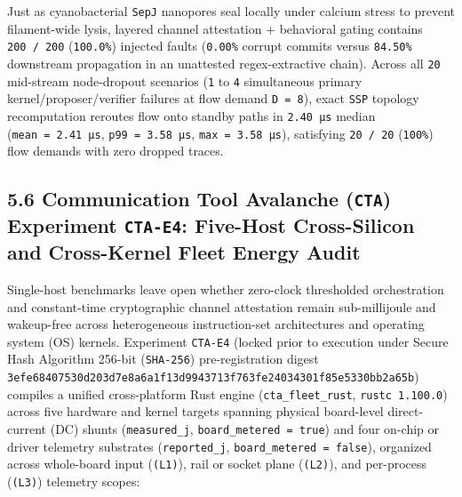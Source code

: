 \documentclass[10pt,letterpaper]{article}
\begin{document}
Just as cyanobacterial \texttt{SepJ} nanopores seal locally under
calcium stress to prevent filament-wide lysis, layered channel
attestation + behavioral gating contains \texttt{200\ /\allowbreak{}\ 200}
(\texttt{100.0\%}) injected faults (\texttt{0.00\%} corrupt commits
versus \texttt{84.50\%} downstream propagation in an unattested
regex-extractive chain). Across all \texttt{20} mid-stream node-dropout
scenarios (\texttt{1} to \texttt{4} simultaneous primary
kernel/proposer/verifier failures at flow demand \texttt{D\ =\ 8}),
exact \texttt{SSP} topology recomputation reroutes flow onto standby
paths in \texttt{2.40\ µs} median (\texttt{mean\ =\ 2.\allowbreak{}41\ µs},
\texttt{p99\ =\ 3.\allowbreak{}58\ µs}, \texttt{max\ =\ 3.\allowbreak{}58\ µs}), satisfying
\texttt{20\ /\ 20} (\texttt{100\%}) flow demands with zero dropped
traces.

\subsection{\texorpdfstring{5.6 Communication Tool Avalanche
(\texttt{CTA}) Experiment \texttt{CTA-E4}: Five-Host Cross-Silicon and
Cross-Kernel Fleet Energy
Audit}{5.6 Communication Tool Avalanche (CTA) Experiment CTA-E4: Five-Host Cross-Silicon and Cross-Kernel Fleet Energy Audit}}\label{communication-tool-avalanche-cta-experiment-cta-e4-five-host-cross-silicon-and-cross-kernel-fleet-energy-audit}

Single-host benchmarks leave open whether zero-clock thresholded
orchestration and constant-time cryptographic channel attestation remain
sub-millijoule and wakeup-free across heterogeneous instruction-set
architectures and operating system (OS) kernels. Experiment
\texttt{CTA-E4} (locked prior to execution under Secure Hash Algorithm
256-bit (\texttt{SHA-256}) pre-registration digest
\texttt{3efe6840\allowbreak{}7530d203\allowbreak{}d7e8a6a1\allowbreak{}f13d9943\allowbreak{}713f763f\allowbreak{}e2403430\allowbreak{}1f85e533\allowbreak{}0bb2a65b})
compiles a unified cross-platform Rust engine
(\texttt{cta\_\allowbreak{}fleet\_\allowbreak{}rust}, \texttt{rustc\ 1.\allowbreak{}100.\allowbreak{}0}) across five
hardware and kernel targets spanning physical board-level direct-current
(DC) shunts (\texttt{measured\_\allowbreak{}j}, \texttt{board\_\allowbreak{}metered\ =\ true}) and
four on-chip or driver telemetry substrates (\texttt{reported\_\allowbreak{}j},
\texttt{board\_\allowbreak{}metered\ =\ false}), organized across whole-board input
(\texttt{(L1)}), rail or socket plane (\texttt{(L2)}), and per-process
(\texttt{(L3)}) telemetry scopes:
\end{document}
